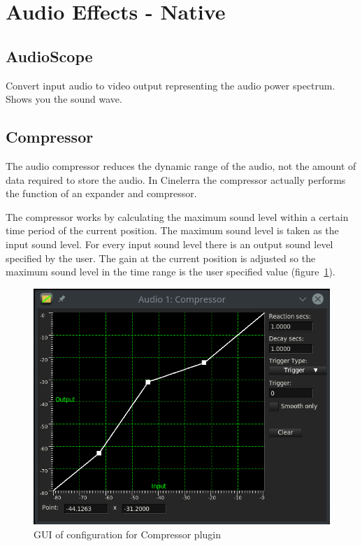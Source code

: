 \section{Audio Effects - Native}%
\label{sec:audio_effects_native}

\subsection{AudioScope}%
\label{sub:audioscope}

Convert input audio to video output representing the audio power spectrum. Shows
you the sound wave.

\subsection{Compressor}%
\label{sub:compressor}

The audio compressor reduces the dynamic range of the audio, not the amount of data required to store the audio. In Cinelerra the compressor actually performs the function of an expander and compressor. 

The compressor works by calculating the maximum sound level within a certain time period of the current position. The maximum sound level is taken as the input sound level. For every input sound level there is an output sound level specified by the user. The gain at the current position is adjusted so the maximum sound level in the time range is the user specified value (figure~\ref{fig:compressor}).

\begin{figure}[htpb]
    \centering
    \includegraphics[width=0.7\linewidth]{images/compressor.png}
    \caption{GUI of configuration for Compressor plugin}
    \label{fig:compressor}
\end{figure}

